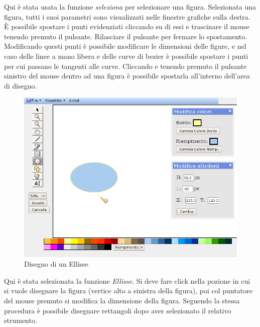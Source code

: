 \vspace{100pt}
Qui \`e stata usata la funzione \textit{seleziona} per selezionare una figura. Selezionata una figura, tutti i suoi parametri sono visualizzati nelle finestre grafiche sulla destra. \`E possibile spostare i punti evidenziati cliccando su di essi e trascinare il mouse tenendo premuto il pulsante. Rilasciare il pulsante per fermare lo spostamento. Modificando questi punti \`e possibile modificare le dimensioni delle figure, e nel caso delle linee a mano libera e delle curve di bezier \`e possibile spostare i punti per cui passano le tangenti alle curve. Cliccando e tenendo premuto il pulsante sinistro del mouse dentro ad una figura \`e possibile spostarla all'interno dell'area di disegno.
\newpage


\begin{figure}[!ht]
\centering
\includegraphics[scale=0.5]{images/ellisse.png}
\caption{Disegno di un Ellisse}
\end{figure} 

\vspace{100pt}
Qui \`e stata selezionata la funzione \textit{Ellisse}. Si deve fare click nella pozione in cui si vuole disegnare la figura (vertice alto a sinistra della figura), poi col puntatore del mouse premuto si modifica la dimensione della figura. Seguendo la stessa procedura \`e possibile disegnare rettangoli dopo aver selezionato il relativo strumento.
\newpage

